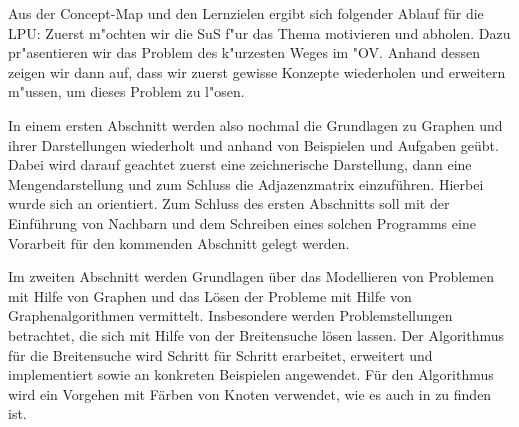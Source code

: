 Aus der Concept-Map und den Lernzielen ergibt sich folgender Ablauf für die LPU:
Zuerst m"ochten wir die SuS f"ur das Thema motivieren und abholen.
Dazu pr"asentieren wir das Problem des k"urzesten Weges im "OV. 
Anhand dessen zeigen wir dann auf, dass wir zuerst gewisse Konzepte wiederholen und erweitern m"ussen, um dieses Problem zu l"osen.

In einem ersten Abschnitt werden also nochmal die Grundlagen zu Graphen und ihrer Darstellungen wiederholt und anhand von Beispielen und Aufgaben geübt. 
Dabei wird darauf geachtet zuerst eine zeichnerische Darstellung, dann eine Mengendarstellung und zum Schluss die Adjazenzmatrix einzuführen. 
Hierbei wurde sich an \cite{cormen,ottmann} orientiert.
Zum Schluss des ersten Abschnitts soll mit der Einführung von Nachbarn und dem Schreiben eines solchen Programms eine Vorarbeit für den kommenden Abschnitt gelegt werden.

Im zweiten Abschnitt werden Grundlagen \"uber das Modellieren von Problemen mit Hilfe von Graphen und das L\"osen der Probleme mit Hilfe von Graphenalgorithmen vermittelt. Insbesondere werden Problemstellungen betrachtet, die sich mit Hilfe von der Breitensuche l\"osen lassen. Der Algorithmus f\"ur die Breitensuche wird Schritt f\"ur Schritt erarbeitet, erweitert und implementiert sowie an konkreten Beispielen angewendet. F\"ur den Algorithmus wird ein Vorgehen mit F\"arben von Knoten verwendet, wie es auch in \cite{cormen} zu finden ist.
